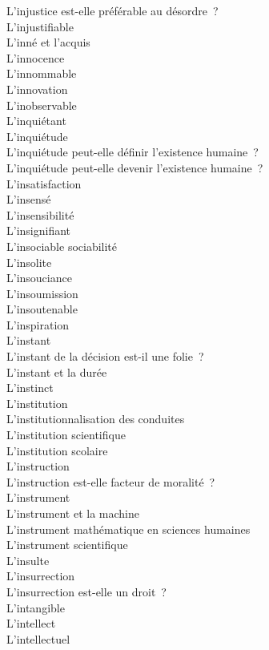 \documentclass[a4paper,12pt]{article}
\begin{document}
L'injustice est-elle préférable au désordre ? \\
L'injustifiable \\
L'inné et l'acquis \\
L'innocence \\
L'innommable \\
L'innovation \\
L'inobservable \\
L'inquiétant \\
L'inquiétude \\
L'inquiétude peut-elle définir l'existence humaine ? \\
L'inquiétude peut-elle devenir l'existence humaine ? \\
L'insatisfaction \\
L'insensé \\
L'insensibilité \\
L'insignifiant \\
L'insociable sociabilité \\
L'insolite \\
L'insouciance \\
L'insoumission \\
L'insoutenable \\
L'inspiration \\
L'instant \\
L'instant de la décision est-il une folie ? \\
L'instant et la durée \\
L'instinct \\
L'institution \\
L'institutionnalisation des conduites \\
L'institution scientifique \\
L'institution scolaire \\
L'instruction \\
L'instruction est-elle facteur de moralité ? \\
L'instrument \\
L'instrument et la machine \\
L'instrument mathématique en sciences humaines \\
L'instrument scientifique \\
L'insulte \\
L'insurrection \\
L'insurrection est-elle un droit ? \\
L'intangible \\
L'intellect \\
L'intellectuel \\
\end{document}
